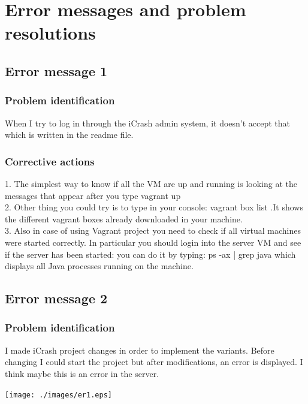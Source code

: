
\chapter{Error messages and problem resolutions}
\label{chap:error_messages}

\section{Error message 1}

\subsection{Problem identification}
When I try to log in through the iCrash admin system, it doesn't accept that
which is written in the readme file.

\subsection{Corrective actions}
1. The simplest way to know if all the VM are up and running is looking at the
messages that appear after you type vagrant up \\
2. Other thing you could try is to type in your console: vagrant box list .It
shows the different vagrant boxes already downloaded in your machine.\\
3. Also in case of using Vagrant project you need to check if all virtual
machines were started correctly. In particular you should login into the server VM and see if the server has been started: you can do it by typing:  ps -ax | grep java which displays all Java processes running on the machine.



\section{Error message 2}

\subsection{Problem identification}
I made iCrash project changes in order to implement the variants. Before
changing I could start the project but after modifications, an error is
displayed. I think maybe this is an error in the server.\\
\begin{center}
\texttt{[image: ./images/er1.eps]}
\end{center}


